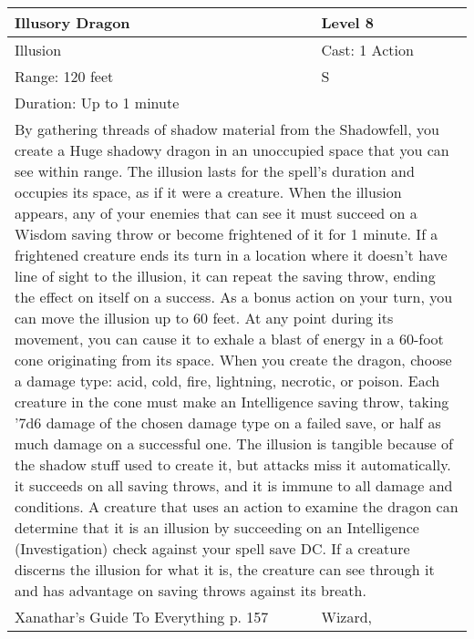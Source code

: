 \documentclass[11pt]{report}
\begin{document}
\begin{table}[H]
	\begin{tabular}{||p{6cm}|p{6cm}||}
		\hline\hline
		\bf{Illusory Dragon} & Level 8\\ \hline
		Illusion & Cast: 1 Action\\ \hline
		Range: 120 feet & S\\ \hline
		Duration: Up to 1 minute & \\ \hline
		\multicolumn{2}{||p{12cm}||}{By gathering threads of shadow material from the Shadowfell, you create a Huge shadowy dragon in an unoccupied space that you can see within range. The illusion lasts for the spell’s duration and occupies its space, as if it were a creature.
When the illusion appears, any of your enemies that can see it must succeed on a Wisdom saving throw or become frightened of it for 1 minute. If a frightened creature ends its turn in a location where it doesn’t have line of sight to the illusion, it can repeat the saving throw, ending the effect on itself on a success.
As a bonus action on your turn, you can move the illusion up to 60 feet. At any point during its movement, you can cause it to exhale a blast of energy in a 60-foot cone originating from its space. When you create the dragon, choose a damage type: acid, cold, fire, lightning, necrotic, or poison. Each creature in the cone must make an Intelligence saving throw, taking '7d6 damage of the
chosen damage type on a failed save, or half as much damage on a successful one.
The illusion is tangible because of the shadow stuff used to create it, but attacks miss it automatically. it succeeds on all saving throws, and it is immune to all damage and conditions. A creature that uses an action to examine the dragon can determine that it is an illusion by succeeding on an Intelligence (Investigation) check against your spell save DC. If a creature discerns the illusion for what it is, the creature can see through it and has advantage on saving throws against its breath.}\\ \hline
Xanathar's Guide To Everything p. 157 & Wizard, \\ \hline\hline
	\end{tabular}
\end{table}
\end{document}
